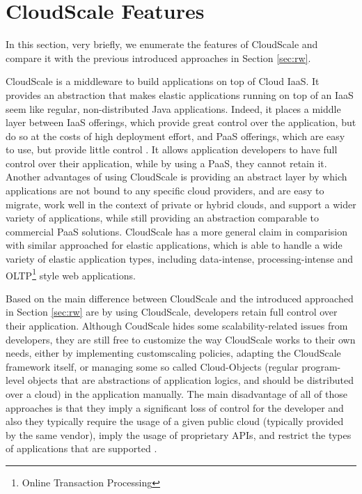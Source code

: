 \documentclass{sig-alternate}
\begin{document}
\section{CloudScale Features} {\label{cloudScale}
In this section, very briefly, we enumerate the features of CloudScale and compare it with the previous introduced approaches in Section \ref{sec:rw}.

CloudScale is a middleware to build applications on top of Cloud IaaS. It provides an abstraction that makes elastic applications running on top of an IaaS seem like regular, non-distributed Java applications. Indeed, it places a middle layer between IaaS offerings, which provide great control over the application, but do so at the costs of high deployment effort, and PaaS offerings, which are easy to use, but provide little control \cite{leitner2012cloudscale}. It allows application developers to have full control over their application, while by using a PaaS, they cannot retain it. Another advantages of using CloudScale is providing an abstract layer by which applications are not bound to any specific cloud providers, and are easy to migrate, work well in the context of private or hybrid clouds, and support a wider variety of applications, while still providing an abstraction comparable to commercial PaaS solutions. CloudScale has a more general claim in comparision with similar approached for elastic applications, which is able to handle a wide variety of elastic application types, including data-intense, processing-intense and OLTP\footnote{Online Transaction Processing} style web applications\cite{Leitner2013}.

Based on \cite{leitner2012cloudscale} the main difference between CloudScale and the introduced approached in Section \ref{sec:rw} are by using CloudScale, developers retain full control over their application. Although CoudScale hides some scalability-related issues from developers, they are still free to customize the way CloudScale works to their own needs, either by implementing customscaling policies, adapting the CloudScale framework itself, or managing some so called Cloud-Objects (regular program-level objects that are abstractions of application logics, and should be distributed over a cloud) in the application manually. The main disadvantage of all of those approaches is that they imply a significant loss of control for the developer and also they typically require the usage of a given public cloud (typically provided by the same vendor), imply the usage of proprietary APIs, and restrict the types of applications that are supported \cite{Leitner2013}.

}
\end{document}
